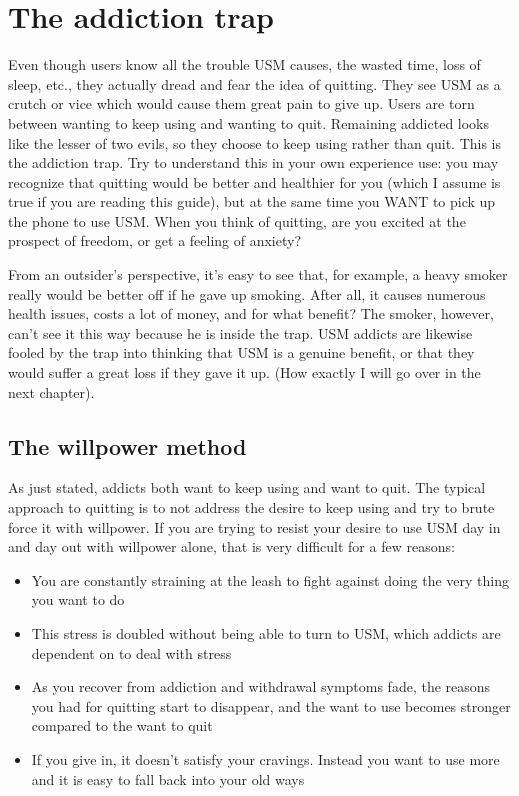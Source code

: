 \documentclass[
  openany]{book}
\providecommand{\tightlist}{%
  \setlength{\itemsep}{0pt}\setlength{\parskip}{0pt}}
\begin{document}
\chapter{The addiction trap}\label{the-addiction-trap}

Even though users know all the trouble USM causes, the wasted time, loss of sleep, etc., they actually dread and fear the idea of quitting. They see USM as a crutch or vice which would cause them great pain to give up. Users are torn between wanting to keep using and wanting to quit. Remaining addicted looks like the lesser of two evils, so they choose to keep using rather than quit. This is the addiction trap. Try to understand this in your own experience use: you may recognize that quitting would be better and healthier for you (which I assume is true if you are reading this guide), but at the same time you WANT to pick up the phone to use USM. When you think of quitting, are you excited at the prospect of freedom, or get a feeling of anxiety?

From an outsider's perspective, it's easy to see that, for example, a heavy smoker really would be better off if he gave up smoking. After all, it causes numerous health issues, costs a lot of money, and for what benefit? The smoker, however, can't see it this way because he is inside the trap. USM addicts are likewise fooled by the trap into thinking that USM is a genuine benefit, or that they would suffer a great loss if they gave it up. (How exactly I will go over in the next chapter).

\section{The willpower method}\label{the-willpower-method}

As just stated, addicts both want to keep using and want to quit. The typical approach to quitting is to not address the desire to keep using and try to brute force it with willpower. If you are trying to resist your desire to use USM day in and day out with willpower alone, that is very difficult for a few reasons:

\begin{itemize}
\tightlist
\item
  You are constantly straining at the leash to fight against doing the very thing you want to do
\item
  This stress is doubled without being able to turn to USM, which addicts are dependent on to deal with stress
\item
  As you recover from addiction and withdrawal symptoms fade, the reasons you had for quitting start to disappear, and the want to use becomes stronger compared to the want to quit
\item
  If you give in, it doesn't satisfy your cravings. Instead you want to use more and it is easy to fall back into your old ways
\end{itemize}
\end{document}
